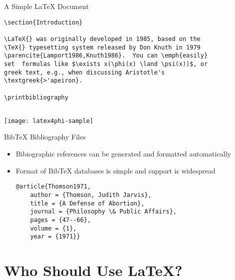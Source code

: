 \begin{frame}[fragile]{A Simple \LaTeX{} Document}

\begin{verbatim}
\section{Introduction}

\LaTeX{} was originally developed in 1985, based on the 
\TeX{} typesetting system released by Don Knuth in 1979
\parencite{Lamport1986,Knuth1986}.  You can \emph{easily} 
set  formulas like $\exists x(\phi(x) \land \psi(x))$, or 
greek text, e.g., when discussing Aristotle's 
\textgreek{>'apeiron}.

\printbibliography


\end{verbatim}
\end{frame}

\begin{frame}

\texttt{[image: latex4phi-sample]}
\end{frame}

\begin{frame}[fragile]{Bib\TeX{} Bibliography Files}

\begin{itemize}
\item Bibiographic references can be generated and formatted automatically
\item Format of Bib\TeX{} databases is simple and support is widespread  
\begin{verbatim}
@article{Thomson1971,
    author = {Thomson, Judith Jarvis},
    title = {A Defense of Abortion},
    journal = {Philosophy \& Public Affairs},
    pages = {47--66},
    volume = {1},
    year = {1971}}
\end{verbatim}
\end{itemize}
\end{frame}

\section{Who Should Use \LaTeX{}?}


